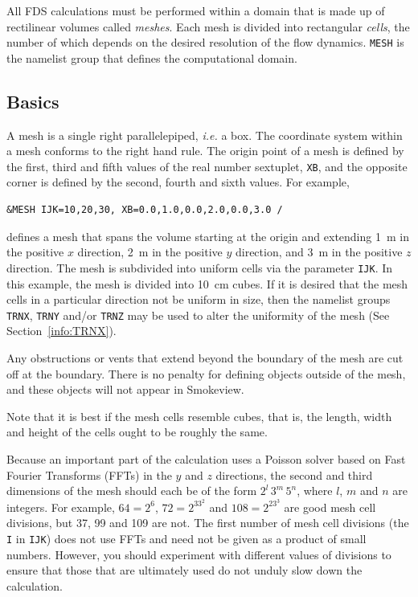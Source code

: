 \documentclass[11pt]{book}
\newcommand{\ct}{\tt\small}
\begin{document}
All FDS calculations must be performed within a domain that is made up
of rectilinear volumes called {\em meshes}. Each mesh is divided into rectangular {\em cells},
the number of which depends on the desired resolution of the flow dynamics.
{\ct MESH} is the namelist group that defines the computational domain.

\subsection{Basics}
\label{info:MESH_Basics}

A mesh is a single right parallelepiped, {\em i.e.} a box.
The coordinate system within a mesh conforms to the right hand rule.
The origin point of a mesh is defined by the first, third
and fifth values of the real number sextuplet, {\ct XB}, and the opposite
corner is defined by the second, fourth and sixth values.
For example,

\footnotesize
\begin{verbatim}
&MESH IJK=10,20,30, XB=0.0,1.0,0.0,2.0,0.0,3.0 /
\end{verbatim}

\normalsize
\noindent
defines a mesh that spans the volume starting at the origin and extending 1~m in the positive
$x$ direction, 2~m in the positive $y$ direction, and 3~m in the positive $z$ direction.
The mesh is subdivided into uniform cells via the parameter
{\ct IJK}. In this example, the mesh is divided into 10~cm cubes.
If it is desired that the mesh cells in a particular direction not be uniform in size,
then the namelist groups {\ct TRNX}, {\ct TRNY} and/or {\ct TRNZ} may be used to alter the
uniformity of the mesh (See Section~\ref{info:TRNX}).

Any obstructions or vents that extend beyond the boundary of the mesh
are cut off at the boundary. There is no penalty for defining objects
outside of the mesh, and these objects will not appear in Smokeview.

\begin{warning}
\noindent
Note that it is best if the mesh cells resemble cubes, that is, the
length, width and height of the cells ought to be roughly the same.
\end{warning}

\noindent
Because an important part of the calculation uses a Poisson solver based on
Fast Fourier Transforms (FFTs) in the $y$ and $z$ directions, the second and third dimensions
of the mesh should each be of the form $2^l \, 3^m \, 5^n$, where
$l$, $m$ and $n$ are integers. For example,
$64=2^6$, $72=2^33^2$ and $108=2^23^3$ are good mesh cell divisions, but 37, 99 and 109 are not.
The first number of mesh cell divisions (the {\ct I} in {\ct IJK}) does not use FFTs and need not be given as a
product of small numbers. However, you should experiment with different values of
divisions to ensure that those that are ultimately used do not unduly slow down the calculation.
\end{document}
